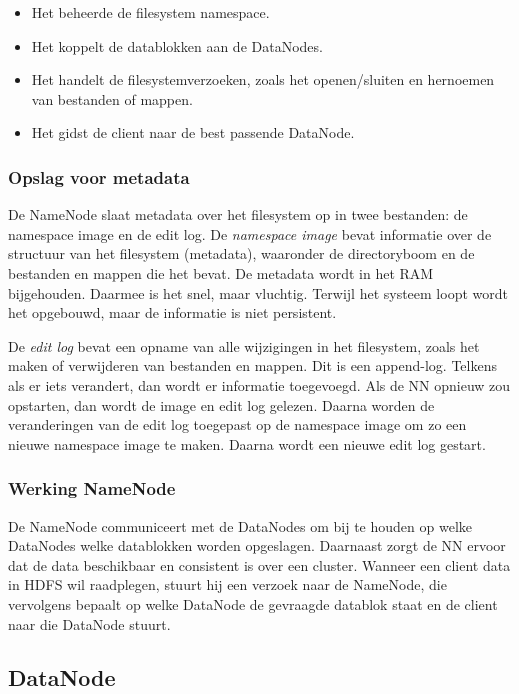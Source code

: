 \documentclass[a4paper,10pt,twoside]{report}
\begin{document}
\begin{itemize}
	\item Het beheerde de filesystem namespace.
	\item Het koppelt de datablokken aan de DataNodes.
	\item Het handelt de filesystemverzoeken, zoals het openen/sluiten en hernoemen van bestanden of mappen.
	\item Het gidst de client naar de best passende DataNode.
\end{itemize}

\subsubsection{Opslag voor metadata}

De NameNode slaat metadata over het filesystem op in twee bestanden: de namespace image en de edit log. De \textit{namespace image} bevat informatie over de structuur van het filesystem (metadata), waaronder de directoryboom en de bestanden en mappen die het bevat. De metadata wordt in het RAM bijgehouden. Daarmee is het snel, maar vluchtig. Terwijl het systeem loopt wordt het opgebouwd, maar de informatie is niet persistent. 

De \textit{edit log} bevat een opname van alle wijzigingen in het filesystem, zoals het maken of verwijderen van bestanden en mappen. Dit is een append-log. Telkens als er iets verandert, dan wordt er informatie toegevoegd. Als de NN opnieuw zou opstarten, dan wordt de image en edit log gelezen. Daarna worden de veranderingen van de edit log toegepast op de namespace image om zo een nieuwe namespace image te maken. Daarna wordt een nieuwe edit log gestart.

\subsubsection{Werking NameNode}

De NameNode communiceert met de DataNodes om bij te houden op welke DataNodes welke datablokken worden opgeslagen. Daarnaast zorgt de NN ervoor dat de data beschikbaar en consistent is over een cluster. Wanneer een client data in HDFS wil raadplegen, stuurt hij een verzoek naar de NameNode, die vervolgens bepaalt op welke DataNode de gevraagde datablok staat en de client naar die DataNode stuurt.

\subsection{DataNode}
\end{document}
